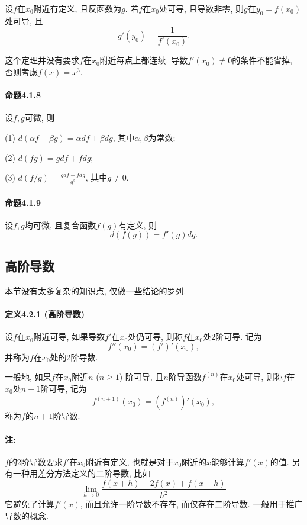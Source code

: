设$f$在$x_{0}$附近有定义, 且反函数为$g$. 若$f$在$x_{0}$处可导, 且导数非零, 则$g$在$y_{0}=f(x_{0})$处可导,
且
\[
g'(y_{0})=\frac{1}{f'(x_{0})}.
\]

这个定理并没有要求$f$在$x_{0}$附近每点上都连续. 导数$f'(x_{0})\ne0$的条件不能省掉, 否则考虑$f(x)=x^{3}$.

\paragraph{命题4.1.8}

设$f,g$可微, 则

(1) $d(\alpha f+\beta g)=\alpha df+\beta dg$, 其中$\alpha,\beta$为常数;

(2) $d(fg)=gdf+fdg$;

(3) $d(f/g)=\frac{gdf-fdg}{g^{2}}$, 其中$g\ne0$.

\paragraph{命题4.1.9}

设$f,g$均可微, 且复合函数$f(g)$有定义, 则
\[
d\left(f(g)\right)=f'(g)dg.
\]


\subsection{高阶导数}

本节没有太多复杂的知识点, 仅做一些结论的罗列.

\paragraph{定义4.2.1 (高阶导数)}

设$f$在$x_{0}$附近可导, 如果导数$f'$在$x_{0}$处仍可导, 则称$f$在$x_{0}$处2阶可导.
记为
\[
f''(x_{0})=(f')'(x_{0}),
\]
并称为$f$在$x_{0}$处的2阶导数. 

一般地, 如果$f$在$x_{0}$附近$n$ ($n\ge1$) 阶可导, 且$n$阶导函数$f^{(n)}$在$x_{0}$处可导,
则称$f$在$x_{0}$处$n+1$阶可导, 记为
\[
f^{(n+1)}(x_{0})=\left(f^{(n)}\right)'(x_{0}),
\]
称为$f$的$n+1$阶导数.

\paragraph{注:}

$f$的2阶导数要求$f'$在$x_{0}$附近有定义, 也就是对于$x_{0}$附近的$x$能够计算$f'(x)$的值.
另有一种用差分方法定义的二阶导数, 比如
\[
\lim_{h\to0}\frac{f(x+h)-2f(x)+f(x-h)}{h^{2}}
\]
它避免了计算$f'(x)$, 而且允许一阶导数不存在, 而仅存在二阶导数. 一般用于推广导数的概念.

